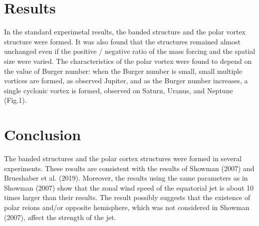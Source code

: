 \documentclass[a4j,multicol,8pt]{jarticle}
\begin{document}
\begin{multicols}{2}
\section{Results}
\vspace{-0.8zh}
In the standard experimetal results,
the banded structure and
the polar vortex structure were formed.
%
%
It was also found that the structures remained almost unchanged
even if the positive / negative
ratio of the mass forcing and the spatial size were varied.
%
%
The characteristics of the polar vortex were
found to depend on the value of Burger number:
when the Burger number is small,
small multiple vortices are formed, as observed Jupiter,
and as the Burger number increases,
a single cyclonic vortex is formed, observed on Saturn, Uranus, and Neptune (Fig.1).
\vspace{-2zh}
\section{Conclusion}
\vspace{-0.8zh}
The banded structures and the polar cortex structures were 
formed in several experiments.
These results are consistent with the results of Showman (2007) and Brueshaber et al. (2019).
%
Moreover, the results using the same parameters as in Showman (2007) show that
the zonal wind speed of the equatorial jet is
about 10 times larger than their results.
%
The result possibly suggests that the existence of polar reions and/or opposite hemisphere,
which was not considered in Showman (2007), affect the strength of the jet.
%
\end{multicols}
\end{document}
